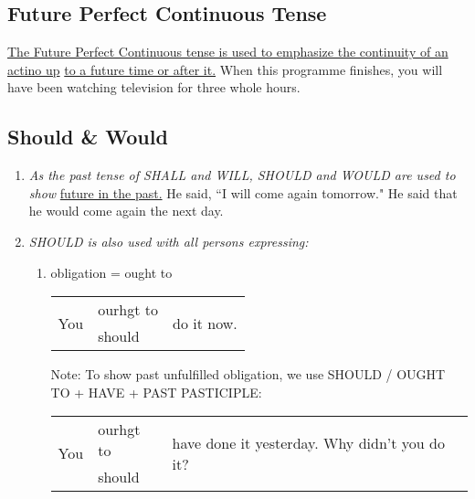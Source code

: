 \subsection{Future Perfect Continuous Tense}
\underline{The Future Perfect Continuous tense is used to emphasize the
continuity of an actino up}
\newline
\underline{to a future time or after it.}
\newline
\newline
When this programme finishes, you will have been watching television for three
whole hours.

\subsection{Should \& Would}
\begin{enumerate}
    \item {\it As the past tense of SHALL and WILL, SHOULD and WOULD are
        used to show}
        \newline
        \underline{future in the past.}
        \newline
        He said, ``I will come again tomorrow."
        \newline
        He said that he would come again the next day.
    \item {\it SHOULD is also used with all persons expressing:}
        \begin{enumerate}
            \item obligation = ought to
                \newline
                \begin{tabular}{lll}
                    \multirow{2}{*}{You} & ourhgt to & \multirow{2}{*}{do it now.} \\
                    & should &
                \end{tabular}
                \newline
                \newline
                Note: To show past unfulfilled obligation, we use SHOULD / OUGHT
                TO + HAVE + PAST PASTICIPLE:
                \newline
                \begin{tabular}{lll}
                    \multirow{2}{*}{You} & ourhgt to & \multirow{2}{*}{have done it yesterday.
                    Why didn't you do it?} \\
                    & should &
                \end{tabular}

\end{enumerate}
\end{enumerate}
